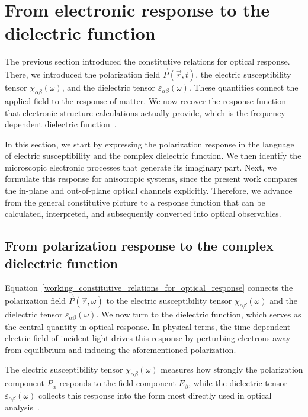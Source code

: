 \newpage
\section{From electronic response to the dielectric function}
\label{sec:from_electronic_response_to_dielectric_function}

The previous section introduced the constitutive relations for optical response.
There, we introduced the polarization field $\vec{P}(\vec{r},t)$,
the electric susceptibility tensor $\chi_{\alpha\beta}(\omega)$,
and the dielectric tensor $\varepsilon_{\alpha\beta}(\omega)$.
These quantities connect the applied field to the response of matter.
We now recover the response function that electronic structure calculations actually provide,
which is the frequency-dependent dielectric function~\cite{onida2002electronic,gajdovs2006linear,ambrosch2006linear}.

In this section, we start by expressing the polarization response in the language of electric susceptibility and the complex dielectric function.
We then identify the microscopic electronic processes that generate its imaginary part.
Next, we formulate this response for anisotropic systems,
since the present work compares the in-plane and out-of-plane optical channels explicitly.
Therefore, we advance from the general constitutive picture to a response function that can be calculated, interpreted, and subsequently converted into optical observables.

\subsection{From polarization response to the complex dielectric function}

Equation~\eqref{working_constitutive_relations_for_optical_response} connects the polarization field $\vec{P}(\vec{r},\omega)$ to the electric susceptibility tensor $\chi_{\alpha\beta}(\omega)$
and the dielectric tensor $\varepsilon_{\alpha\beta}(\omega)$.
We now turn to the dielectric function, which serves as the central quantity in optical response. 
In physical terms, the time-dependent electric field of incident light drives this response by perturbing electrons away from equilibrium and inducing the aforementioned polarization.

The electric susceptibility tensor $\chi_{\alpha\beta}(\omega)$ measures how strongly the polarization component $P_\alpha$ responds to the field component $E_\beta$, while the dielectric tensor $\varepsilon_{\alpha\beta}(\omega)$ collects this response into the form most directly used in optical analysis~\cite{gajdovs2006linear}.

